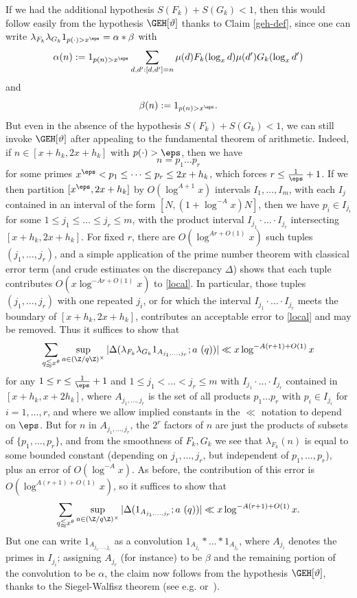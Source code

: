 If we had the additional hypothesis $S(F_k) + S(G_k) < 1$, then this would follow easily from the hypothesis $\GEH[\vartheta]$ thanks to Claim \ref{geh-def}, since one can write $\lambda_{F_k} \lambda_{G_k} 1_{p(\cdot) > x^\eps} = \alpha \ast \beta$ with
$$ \alpha(n) := 1_{p(n) > x^\eps} \sum_{d,d': [d,d'] = n} \mu(d) F_k(\log_x d) \mu(d') G_k(\log_x d')$$
and
$$ \beta(n) := 1_{p(n) > x^\eps}.$$
But even in the absence of the hypothesis $S(F_k) + S(G_k) < 1$, we can still invoke $\GEH[\vartheta]$ after appealing to the fundamental theorem of arithmetic.  Indeed, if $n \in [x+h_k,2x+h_k]$ with $p(\cdot) > \eps$, then we have
$$ n = p_1 \dots p_r$$
for some primes $x^\eps < p_1 \leq \dots \leq p_r \leq 2x+h_k$, which forces $r \leq \frac{1}{\eps}+1$.  If we then partition $[x^\eps,2x+h_k]$ by $O( \log^{A+1} x )$ intervals $I_1,\dots,I_m$, with each $I_j$ contained in an interval of the form $[N, (1+\log^{-A} x) N]$, then we have $p_i \in I_{j_i}$ for some $1 \leq j_1 \leq \dots \leq j_r \leq m$, with the product interval $I_{j_1} \cdot \dots \cdot I_{j_r}$ intersecting $[x+h_k, 2x+h_k]$.  For fixed $r$, there are $O( \log^{Ar+O(1)} x)$ such tuples $(j_1,\dots,j_r)$, and a simple application of the prime number theorem with classical error term (and crude estimates on the discrepancy $\Delta$) shows that each tuple contributes $O( x \log^{-Ar+O(1)} x)$ to \eqref{local}. In particular, those tuples $(j_1,\dots,j_r)$ with one repeated $j_i$, or for which the interval $I_{j_1} \cdot \dots \cdot I_{j_r}$ meets the boundary of $[x+h_k, 2x+h_k]$, contributes an acceptable error to \eqref{local} and may be removed.  Thus it suffices to show that 
$$
\sum_{q \lessapprox x^\theta} \sup_{a \in (\Z/q\Z)^\times} |\Delta( \lambda_{F_k} \lambda_{G_k} 1_{A_{j_1,\dots,j_r}};  a\ (q))| \ll x \log^{-A(r+1)+O(1)} x
$$
for any $1 \leq r \leq \frac{1}{\eps}+1$ and $1 \leq j_1 < \dots < j_r \leq m$ with $I_{j_1} \cdot \dots \cdot I_{j_r}$ contained in $[x+h_k,x+2h_k]$, where $A_{j_1,\dots,j_r}$ is the set of all products $p_1 \dots p_r$ with $p_i \in I_{j_i}$ for $i=1,\dots,r$, and where we allow implied constants in the $\ll$ notation to depend on $\eps$.  But for $n$ in $A_{j_1,\dots,j_r}$, the $2^r$ factors of $n$ are just the products of subsets of $\{p_1,\dots,p_r\}$, and from the smoothness of $F_k,G_k$ we see that $\lambda_{F_k}(n)$ is equal to some bounded constant (depending on $j_1,\dots,j_r$, but independent of $p_1,\dots,p_r$), plus an error of $O(\log^{-A} x)$.  As before, the contribution of this error is $O( \log^{A(r+1)+O(1)} x)$, so it suffices to show that
$$
\sum_{q \lessapprox x^\theta} \sup_{a \in (\Z/q\Z)^\times} |\Delta( 1_{A_{j_1,\dots,j_r}};  a\ (q))| \ll x \log^{-A(r+1)+O(1)} x.
$$
But one can write $1_{A_{j_1,\dots,j_r}}$ as a convolution $1_{A_{j_1}} \ast \dots \ast 1_{A_{j_r}}$, where $A_{j_i}$ denotes the primes in $I_{j_i}$; assigning $A_{j_r}$ (for instance) to be $\beta$ and the remaining portion of the convolution to be $\alpha$, the claim now follows from the hypothesis $\GEH[\vartheta]$, thanks to the Siegel-Walfisz theorem (see e.g. \cite[Satz 4]{siebert} or~\cite[Th. 5.29]{ik}).

